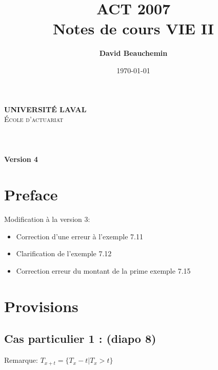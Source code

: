 \documentclass[11pt,french]{report}
\title{ACT 2007 \\ Notes de cours VIE II}
\author{\textbf{David Beauchemin}}
\date{\today}
\begin{document}
\makeatletter
  \begin{titlepage}
  \centering
      {\large \textbf{\textsc{UNIVERSITÉ LAVAL}}}\\
      \textsc{École d'actuariat}\\
    \vspace{2cm}
    \vspace{2cm}
      {\LARGE \textbf{\@title}} \\
    \vfill
       {\large \@author} \\
    \vspace{4cm}
        {\large\textbf{\@date}}\\
    \vfill
    {\large\textbf{Version 4}}\\
    \vfill
  \end{titlepage}
\makeatother


\tableofcontents
\newpage
\chapter*{Preface}
Modification à la version 3: \\
\begin{itemize}
\item Correction d'une erreur à l'exemple 7.11 
\item Clarification de l'exemple 7.12
\item Correction erreur du montant de la prime exemple 7.15
\end{itemize}

\chapter{Provisions}
\label{chap:provi}

\section{Cas particulier 1 : (diapo 8)}
Remarque: $ T_{x+t} = \lbrace T_x -t | T_x > t\rbrace $
\end{document}
